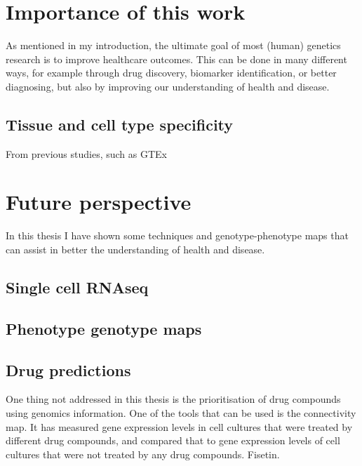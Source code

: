 \section{Importance of this work}
As mentioned in my introduction, the ultimate goal of most (human) genetics research is to improve healthcare outcomes. This can be done in many different ways, for example through drug discovery, biomarker identification, or better diagnosing, but also by improving our understanding of health and disease\cite{mcguireRoadAheadGenetics2020, claussnitzerBriefHistoryHuman2020e}.  

\subsection{Tissue and cell type specificity}
From previous studies, such as GTEx\cite{lonsdaleGenotypeTissueExpressionGTEx2013}

\section{Future perspective}
In this thesis I have shown some techniques and genotype-phenotype maps that can assist in better the understanding of health and disease. 

\subsection{Single cell RNAseq}
\subsection{Phenotype genotype maps}
\subsection{Drug predictions}
One thing not addressed in this thesis is the prioritisation of drug compounds using genomics information. One of the tools that can be used is the connectivity map\cite{lambConnectivityMapUsing2006}. It has measured gene expression levels in cell cultures that were treated by different drug compounds, and compared that to gene expression levels of cell cultures that were not treated by any drug compounds. Fisetin\cite{gibbsHumanGenomeProject2020}. 